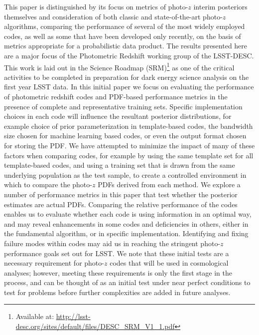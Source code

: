 This paper is distinguished by its focus on metrics of photo-$z$ interim posteriors themselves and consideration of both classic and state-of-the-art photo-$z$ algorithms, comparing the performance of several of the most widely employed codes, as well as some that have been developed only recently, on the basis of metrics appropriate for a probabilistic data product.
The results presented here are
a major focus of the Photometric Redshift working group of the LSST-DESC.
This work is laid out in the Science Roadmap (SRM)\footnote{Available at: \url{http://lsst-desc.org/sites/default/files/DESC_SRM_V1_1.pdf}} as one of the critical activities to be completed in preparation for dark energy science analysis on the first year LSST data.
In this initial paper we focus on evaluating the performance of photometric redshift codes and PDF-based performance metrics in the presence of complete and representative training sets.  Specific implementation choices in each code will influence the resultant posterior distributions, for example choice of prior parameterization in template-based codes, the bandwidth size chosen for machine learning based codes, or even the output format chosen for storing the PDF.  We have attempted to minimize the impact of many of these factors when comparing codes, for example by using the same template set for all template-based codes, and using a training set that is drawn from the same underlying population as the test sample, to create a controlled environment in which to compare the photo-$z$ PDFs derived from each method.  We explore a number of performance metrics in this paper that test whether the posterior estimates are actual PDFs.  
Comparing the relative performance of the codes enables us to evaluate whether each code is using information in an optimal way, and may reveal enhancements in some codes and deficiencies in others, either in the fundamental algorithm, or in specific implementation.  Identifying and fixing failure modes within codes may aid us in reaching the stringent photo-$z$ performance goals set out for LSST.  We note that these initial tests are a necessary requirement for photo-$z$ codes that will be used in cosmological analyses; however, meeting these requirements is only the first stage in the process, and can be thought of as an initial test under near perfect conditions to test for problems before further complexities are added in future analyses.



